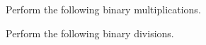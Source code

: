 \item Perform the following binary multiplications.


\item Perform the following binary divisions.

